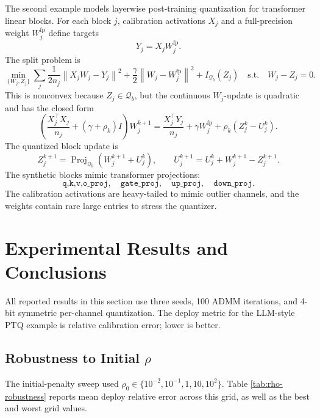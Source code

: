 \documentclass[11pt]{article}
\newcommand{\proj}{\operatorname{Proj}}
\newcommand{\norm}[1]{\left\lVert #1 \right\rVert}
\newcommand{\Q}{\mathcal{Q}}
\begin{document}
The second example models layerwise post-training quantization for transformer
linear blocks.  For each block \(j\), calibration activations \(X_j\) and a
full-precision weight \(W_j^{\mathrm{fp}}\) define targets
\begin{equation}
    Y_j=X_jW_j^{\mathrm{fp}}.
\end{equation}
The split problem is
\begin{equation}
    \min_{\{W_j,Z_j\}}
    \sum_j
    \frac{1}{2n_j}\norm{X_jW_j-Y_j}^2
    +\frac{\gamma}{2}\norm{W_j-W_j^{\mathrm{fp}}}^2
    +I_{\Q_b}(Z_j)
    \quad\text{s.t.}\quad
    W_j-Z_j=0.
    \label{eq:llm-ptq}
\end{equation}
This is nonconvex because \(Z_j\in\Q_b\), but the continuous \(W_j\)-update is
quadratic and has the closed form
\begin{equation}
    \left(
        \frac{X_j^\top X_j}{n_j}
        +(\gamma+\rho_k)I
    \right)
    W_j^{k+1}
    =
    \frac{X_j^\top Y_j}{n_j}
    +\gamma W_j^{\mathrm{fp}}
    +\rho_k(Z_j^k-U_j^k).
    \label{eq:llm-ptq-w-update}
\end{equation}
The quantized block update is
\begin{equation}
    Z_j^{k+1}=\proj_{\Q_b}(W_j^{k+1}+U_j^k),
    \qquad
    U_j^{k+1}=U_j^k+W_j^{k+1}-Z_j^{k+1}.
\end{equation}
The synthetic blocks mimic transformer projections:
\[
\texttt{q,k,v,o\_proj},\quad
\texttt{gate\_proj},\quad
\texttt{up\_proj},\quad
\texttt{down\_proj}.
\]
The calibration activations are heavy-tailed to mimic outlier channels, and the
weights contain rare large entries to stress the quantizer.

\section{Experimental Results and Conclusions}

All reported results in this section use three seeds, 100 ADMM iterations, and
4-bit symmetric per-channel quantization.  The deploy metric for the LLM-style
PTQ example is relative calibration error; lower is better.

\subsection{Robustness to Initial \texorpdfstring{\(\rho\)}{rho}}

The initial-penalty sweep used
\(\rho_0\in\{10^{-2},10^{-1},1,10,10^2\}\).  Table
\ref{tab:rho-robustness} reports mean deploy relative error across this grid,
as well as the best and worst grid values.
\end{document}

